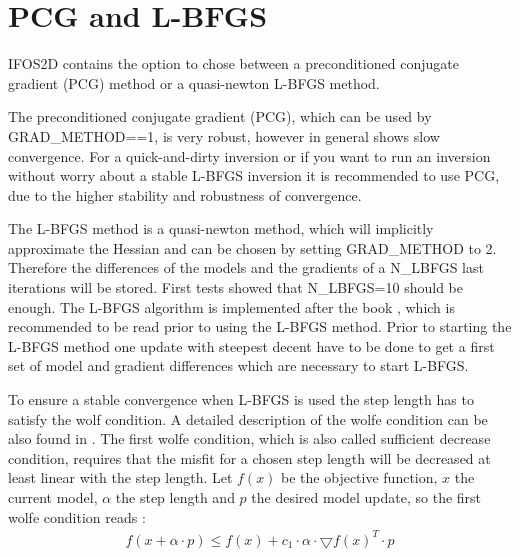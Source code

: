\section{PCG and L-BFGS}
{\color{blue}{\begin{verbatim}
"Gradient-Method" : "comment",
			"GRAD_METHOD" : "2",
			"N_LBFGS" : "5",
			
			"WOLFE_CONDITION" : "1",
			"WOLFE_TRY_OLD_STEPLENGTH" : "1",
			"WOLFE_NUM_TEST" : "5", 
			"WOLFE_C1_SL" : "1e-4",
			"WOLFE_C2_SL" : "0.9",
			
			"LBFGS_STEP_LENGTH" : "0",
\end{verbatim}}}

{\color{red}{\begin{verbatim}
Default values are:
	"GRAD_METHOD" : "1",
\end{verbatim}}}

IFOS2D contains the option to chose between a preconditioned conjugate gradient (PCG) method or a quasi-newton L-BFGS method.

The preconditioned conjugate gradient (PCG), which can be used by GRAD\_METHOD==1, is very robust, however in general shows slow convergence. For a quick-and-dirty inversion or if you want to run an inversion without worry about a stable L-BFGS inversion it is recommended to use PCG, due to the higher stability and robustness of convergence.

The L-BFGS method is a quasi-newton method, which will implicitly approximate the Hessian and can be chosen by setting GRAD\_METHOD to 2. Therefore the differences of the models and the gradients of a N\_LBFGS last iterations will be stored. First tests showed that N\_LBFGS=10 should be enough. The L-BFGS algorithm is implemented after the book \cite{nocedal:1999}, which is recommended to be read prior to using the L-BFGS method. Prior to starting the L-BFGS method one update with steepest decent have to be done to get a first set of model and gradient differences which are necessary to start L-BFGS.

To ensure a stable convergence when L-BFGS is used the step length has to satisfy the wolf condition. A detailed description of the wolfe condition can be also found in \cite{nocedal:1999}. The first wolfe condition, which is also called sufficient decrease condition, requires that the misfit for a chosen step length will be decreased at least linear with the step length. Let $f(x)$ be the objective function, $x$ the current model, $\alpha$ the step length and $p$ the desired model update, so the first wolfe condition reads \citep{nocedal:1999}:
\begin{align}
	f(x+\alpha \cdot p) \le f(x) + c_1 \cdot \alpha \cdot\bigtriangledown f(x)^{T} \cdot p
\end{align}

